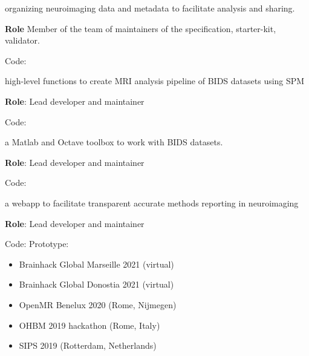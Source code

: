 
 organizing neuroimaging data and metadata to facilitate analysis and sharing.

\textbf{Role} Member of the team of maintainers of the specification, starter-kit, validator.

\textbullet Code: 

\vspace{5mm}


 high-level functions to create MRI analysis pipeline of BIDS datasets using SPM

\textbf{Role}: Lead developer and maintainer

\textbullet Code: 

\vspace{5mm}


 a Matlab and Octave toolbox to work with BIDS datasets.

\textbf{Role}: Lead developer and maintainer

\textbullet Code: 

\vspace{5mm}


 a webapp to facilitate transparent accurate methods reporting in neuroimaging

\textbf{Role}: Lead developer and maintainer

\textbullet Code:  
\textbullet {}
\textbullet Prototype: 

\vspace{5mm}



\begin{itemize}
    \item Brainhack Global Marseille 2021 (virtual) 
    \item Brainhack Global Donostia 2021 (virtual) 
    \item OpenMR Benelux 2020 (Rome, Nijmegen) 
    \item OHBM 2019 hackathon (Rome, Italy) 
\end{itemize}

\begin{itemize}
    \item SIPS 2019 (Rotterdam, Netherlands) 
\end{itemize}
